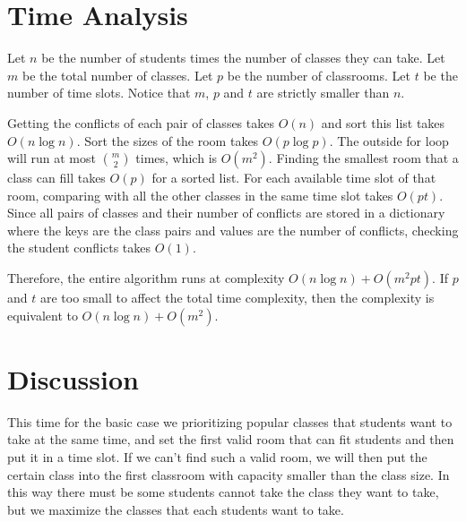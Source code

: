 \documentclass[11pt, oneside]{article}   	%
\begin{document}
\begin{algorithm}[H]

\end{algorithm}
\section{Time Analysis}
Let $n$ be the number of students times the number of classes they can take. Let $m$ be the total number of classes. Let $p$ be the number of classrooms. Let $t$ be the number of time slots. Notice that $m$, $p$ and $t$ are strictly smaller than $n$.

Getting the conflicts of each pair of classes takes $O(n)$ and sort this list takes $O(n\log n)$. Sort the sizes of the room takes $O(p \log p)$. The outside for loop will run at most $m \choose 2$ times, which is $O(m^2)$. Finding the smallest room that a class can fill takes $O(p)$ for a sorted list. For each available time slot of that room, comparing with all the other classes in the same time slot takes $O(pt)$. Since all pairs of classes and their number of conflicts are stored in a dictionary where the keys are the class pairs and values are the number of conflicts, checking the student conflicts takes $O(1)$.

Therefore, the entire algorithm runs at complexity $O(n \log n)+O(m^2pt)$. If $p$ and $t$ are too small to affect the total time complexity, then the complexity is equivalent to $O(n \log n)+O(m^2)$.

\section{Discussion}
This time for the basic case we prioritizing popular classes that students want to take at the same time, and set the first valid room that can fit students and then put it in a time slot. If we can't find such a valid room, we will then put the certain class into the first classroom with capacity smaller than the class size. In this way there must be some students cannot take the class they want to take, but we maximize the classes that each students want to take.
\end{document}

